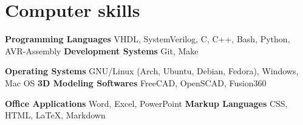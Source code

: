 \section{Computer skills}

\cvdoubleitem{}
{
  \textbf{Programming Languages}\vspace{1mm}\newline{}
  VHDL, SystemVerilog, C, C++, Bash, Python, AVR-Assembly
}
{}
{
  \textbf{Development Systems}\vspace{1mm}\newline{}
  Git, Make
}

\vspace{2mm}

\cvdoubleitem{}
{
  \textbf{Operating Systems}\vspace{1mm}\newline{}
  GNU/Linux (Arch, Ubuntu, Debian, Fedora), Windows, Mac OS
}
{}
{
  \textbf{3D Modeling Softwares}\vspace{1mm}\newline{}
  FreeCAD, OpenSCAD, Fusion360
}

\vspace{2mm}

\cvdoubleitem {}
{
  \textbf{Office Applications}\vspace{1mm}\newline{}
  Word, Excel, PowerPoint
}
{}
{
  \textbf{Markup Languages}\vspace{1mm}\newline{}
  CSS, HTML, \LaTeX, Markdown
}
